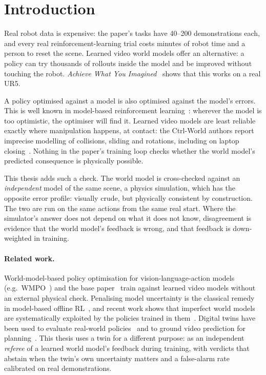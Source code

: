 \section{Introduction}
Real robot data is expensive: the paper's tasks have 40--200 demonstrations each, and every real reinforcement-learning trial costs minutes of robot time and a person to reset the scene. Learned video world models offer an alternative: a policy can try thousands of rollouts inside the model and be improved without touching the robot. \emph{Achieve What You Imagined}~\cite{a2a} shows that this works on a real UR5.

A policy optimised against a model is also optimised against the model's errors. This is well known in model-based reinforcement learning~\cite{mopo,exploitable}: wherever the model is too optimistic, the optimiser will find it. Learned video models are least reliable exactly where manipulation happens, at contact: the Ctrl-World authors report imprecise modelling of collisions, sliding and rotations, including on laptop closing~\cite{ctrlworld}. Nothing in the paper's training loop checks whether the world model's predicted consequence is physically possible.

This thesis adds such a check. The world model is cross-checked against an \emph{independent} model of the same scene, a physics simulation, which has the opposite error profile: visually crude, but physically consistent by construction. The two are run on the same actions from the same real start. Where the simulator's answer does not depend on what it does not know, disagreement is evidence that the world model's feedback is wrong, and that feedback is down-weighted in training.

\paragraph{Related work.} World-model-based policy optimisation for vision-language-action models (e.g.\ WMPO~\cite{wmpo}) and the base paper~\cite{a2a} train against learned video models without an external physical check. Penalising model uncertainty is the classical remedy in model-based offline RL~\cite{mopo}, and recent work shows that imperfect world models are systematically exploited by the policies trained in them~\cite{exploitable}. Digital twins have been used to evaluate real-world policies~\cite{realissim} and to ground video prediction for planning~\cite{vptwin}. This thesis uses a twin for a different purpose: as an independent \emph{referee} of a learned world model's feedback during training, with verdicts that abstain when the twin's own uncertainty matters and a false-alarm rate calibrated on real demonstrations.

